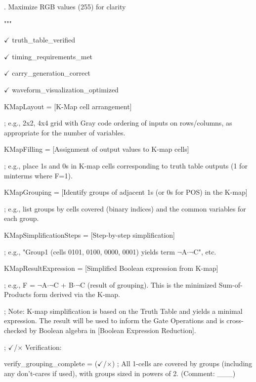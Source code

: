 \documentclass[11pt]{article}
\begin{document}
. Maximize RGB values (255) for clarity

\noindent """

\vspace{0.5em}


\noindent $\checkmark$ truth\_table\_verified

\noindent $\checkmark$ timing\_requirements\_met

\noindent $\checkmark$ carry\_generation\_correct

\noindent $\checkmark$ waveform\_visualization\_optimized

\noindent KMapLayout = [K-Map cell arrangement]

\noindent ; e.g., 2x2, 4x4 grid with Gray code ordering of inputs on rows/columns, as appropriate for the number of variables.

\noindent KMapFilling = [Assignment of output values to K-map cells]

\noindent; e.g., place 1s and 0s in K-map cells corresponding to truth table outputs (1 for minterms where F=1).

\noindent KMapGrouping = [Identify groups of adjacent 1s (or 0s for POS) in the K-map]

\noindent ; e.g., list groups by cells covered (binary indices) and the common variables for each group.

\noindent KMapSimplificationSteps = [Step-by-step simplification]

\noindent; e.g., "Group1 (cells 0101, 0100, 0000, 0001) yields term $\lnot$A$\cdot$$\lnot$C", etc.

\noindent KMapResultExpression = [Simplified Boolean expression from K-map]

\noindent; e.g., F = $\lnot$A$\cdot$$\lnot$C + B$\cdot$$\lnot$C (result of grouping). This is the minimized Sum-of-Products form derived via the K-map.

\noindent ; Note: K-map simplification is based on the Truth Table and yields a minimal expression. The result will be used to inform the Gate Operations and is cross-checked by Boolean algebra in [Boolean Expression Reduction].

\vspace{0.5em}

\noindent ; $\checkmark$/$\times$ Verification:

\noindent verify\_grouping\_complete = ($\checkmark$/$\times$) ; All 1-cells are covered by groups (including any don't-cares if used), with groups sized in powers of 2. (Comment: \_\_\_)
\end{document}
